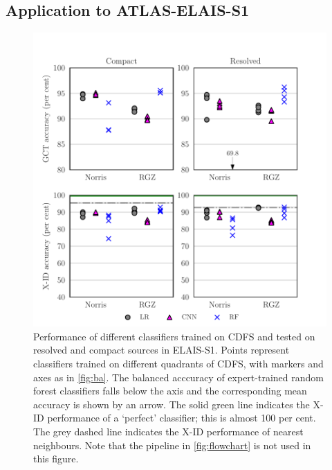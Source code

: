 \documentclass[fleqn,usenatbib,usedcolumn]{mnras}
\begin{document}
\subsection{Application to ATLAS-ELAIS-S1}
  \label{sec:elais}

  \begin{figure}
  \centering
  \includegraphics[width=\columnwidth]{images/elais-grid-new.pdf}
  \caption{Performance of different classifiers trained on CDFS and tested on resolved and compact sources in ELAIS-S1. Points represent classifiers trained on different quadrants of CDFS, with markers and axes as in \autoref{fig:ba}. The balanced acccuracy of expert-trained random forest classifiers falls below the axis and the corresponding mean accuracy is shown by an arrow. The solid green line indicates the X-ID performance of a `perfect' classifier; this is almost 100 per cent. The grey dashed line indicates the X-ID performance of nearest neighbours. Note that the pipeline in \autoref{fig:flowchart} is not used in this figure.
    \label{fig:elais-ba}}
  \end{figure}
\end{document}
